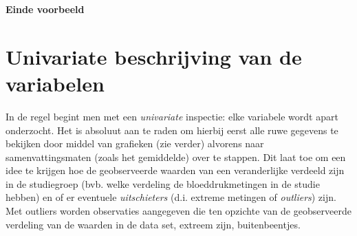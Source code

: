 \documentclass[
  dutch,
  letterpaper,
  12pt]{book}
\theoremstyle{definition}
\theoremstyle{definition}
\theoremstyle{definition}
\theoremstyle{remark}
\begin{document}
\textbf{Einde voorbeeld}

\begin{table}

\caption{\label{tbl-nhanesDatExpl}}


\end{table}%

\section{Univariate beschrijving van de variabelen}\label{sec-univar}

In de regel begint men met een \emph{univariate} inspectie: elke
variabele wordt apart onderzocht. Het is absoluut aan te raden om
hierbij eerst alle ruwe gegevens te bekijken door middel van grafieken
(zie verder) alvorens naar samenvattingsmaten (zoals het gemiddelde)
over te stappen. Dit laat toe om een idee te krijgen hoe de
geobserveerde waarden van een veranderlijke verdeeld zijn in de
studiegroep (bvb. welke verdeling de bloeddrukmetingen in de studie
hebben) en of er eventuele \emph{uitschieters} (d.i. extreme metingen of
\emph{outliers}) zijn. Met outliers worden observaties aangegeven die
ten opzichte van de geobserveerde verdeling van de waarden in de data
set, extreem zijn, buitenbeentjes.
\end{document}
